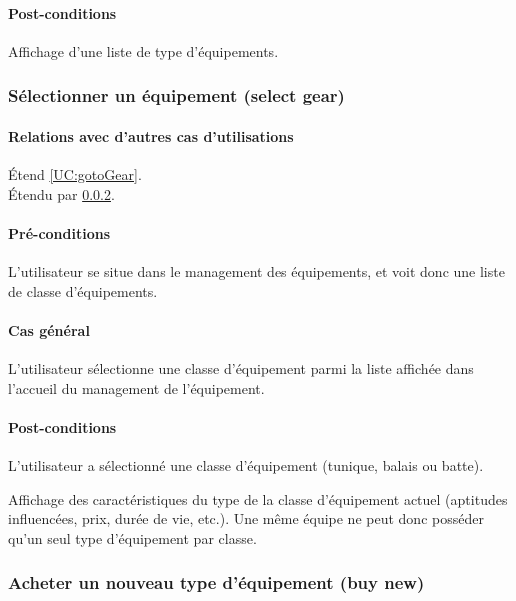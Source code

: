 \paragraph{Post-conditions}
\begin{list}{}{\leftmargin=1.5em}
\item{Affichage d'une liste de type d'équipements.}
\end{list}

 \subsubsection{Sélectionner un équipement (select gear)}
\label{UC:selectGear}
\paragraph{Relations avec d'autres cas d'utilisations}
Étend \ref{UC:gotoGear}.\\
Étendu par \ref{UC:buyGear}.
\paragraph{Pré-conditions}
\begin{list}{}{\leftmargin=1.5em}
\item{L'utilisateur se situe dans le management des équipements, et voit donc une liste de classe d'équipements.}
\end{list}
\paragraph{Cas général}
L'utilisateur sélectionne une classe d'équipement parmi la liste affichée dans l'accueil du management de l'équipement.
\paragraph{Post-conditions}
\begin{list}{}{\leftmargin=1.5em}
\item{L'utilisateur a sélectionné une classe d'équipement (tunique, balais ou batte).}
\item{Affichage des caractéristiques du type de la classe d'équipement actuel (aptitudes influencées, prix, durée de vie, etc.). Une même équipe ne peut donc posséder qu'un seul type d'équipement par classe.}
\end{list}

\subsubsection{Acheter un nouveau type d'équipement (buy new)}
\label{UC:buyGear}
